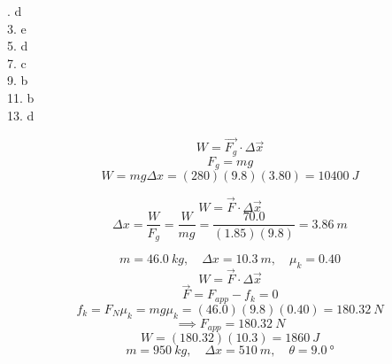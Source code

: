 \documentclass[11pt]{homework}
\begin{document}
\maketitle

\renewcommand{\questiontype}{MisConcQ}
\setcounter{questionCounter}{0}

. d\\
3. e\\
5. d\\
7. c\\
9. b\\
11. b\\
13. d

\renewcommand{\questiontype}{Problem}
\setcounter{questionCounter}{0}

\question
\[    
W= \vec{F_g}\cdot\Delta \vec{x}
\]\[
F_g = mg 
\]\[
W = mg \Delta x  = (280)(9.8)(3.80) = \boxed{\qty{10400}{J}}
\]

\question
\[
W = \vec{F}\cdot \Delta\vec{x}
\] \[
\Delta x = \frac{W}{F_g} = \frac{W}{mg} = \frac{70.0}{(1.85)(9.8)} = \boxed{\qty{3.86}{m}}
\]

\setcounter{questionCounter}{4}
\question
\[
m = \qty{46.0}{kg}, \quad \Delta x = \qty{10.3}{m}, \quad \mu_k = 0.40
\]\[
W = \vec{F}\cdot \Delta\vec{x}
\]\[
\vec{F}=F_{app} - f_k = 0
\]\[
f_k = F_N\mu_k = mg\mu_k = (46.0)(9.8)(0.40) = \qty{180.32}{N}
\] \[
\implies F_{app} = \qty{180.32}{N}
\]\[
W = (180.32)(10.3) = \boxed{\qty{1860}{J}}
\]
\setcounter{questionCounter}{7}
\question
\[
    m = \qty{950}{kg}, \quad \Delta x = \qty{510}{m}, \quad \theta = \qty{9.0}{\degree}
\]
\end{document}
